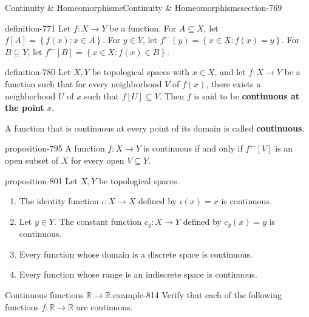 \documentclass[oneside,10pt,]{article}
\newcommand{\terminology}[1]{\textbf{#1}}
\newcommand{\mb}{\mathbb}
\newcommand{\setBuilder}[2]{\left\{#1:#2\right\}}
\begin{document}
\begin{sectionptx}{Continuity \& Homeomorphisms}{}{Continuity \& Homeomorphisms}{}{}{section-769}
\begin{definition}{}{definition-771}%
\hypertarget{p-772}{}%
Let \(f:X\to Y\) be a function. For \(A\subseteq X\), let \(f[A]=\setBuilder{f(x)}{x\in A}\). For \(y\in Y\), let \(f^\leftarrow(y)=\setBuilder{x\in X}{f(x)=y}\). For \(B\subseteq Y\), let \(f^\leftarrow[B]=\setBuilder{x\in X}{f(x)\in B}\).%
\end{definition}
\begin{definition}{}{definition-780}%
\hypertarget{p-781}{}%
Let \(X,Y\) be topological spaces with \(x\in X\), and let \(f:X\to Y\) be a function such that for every neighborhood \(V\) of \(f(x)\), there exists a neighborhood \(U\) of \(x\) such that \(f[U]\subseteq V\). Then \(f\) is said to be \terminology{continuous at the point} \(x\).%
\par
\hypertarget{p-793}{}%
A function that is continuous at every point of its domain is called \terminology{continuous}.%
\end{definition}
\begin{proposition}{}{}{proposition-795}%
\hypertarget{p-796}{}%
A function \(f:X\to Y\) is continuous if and only if \(f^\leftarrow[V]\) is an open subset of \(X\) for every open \(V\subseteq Y\).%
\end{proposition}
\begin{proposition}{}{}{proposition-801}%
\hypertarget{p-802}{}%
Let \(X,Y\) be topological spaces.%
\leavevmode%
\begin{enumerate}
\item\hypertarget{li-805}{}The identity function \(\iota:X\to X\) defined by \(\iota(x)=x\) is continuous.%
\item\hypertarget{li-808}{}Let \(y\in Y\). The constant function \(c_y:X\to Y\) defined by \(c_y(x)=y\) is continuous.%
\item\hypertarget{li-812}{}Every function whose domain is a discrete space is continuous.%
\item\hypertarget{li-813}{}Every function whose range is an indiscrete space is continuous.%
\end{enumerate}
\end{proposition}
\begin{example}{Continuous functions \(\mb R\to\mb R\).}{example-814}%
\hypertarget{p-817}{}%
Verify that each of the following functions \(f:\mb R\to\mb R\) are continuous.%
\leavevmode%
\begin{enumerate}

\end{enumerate}
\end{example}
\end{sectionptx}
\end{document}
